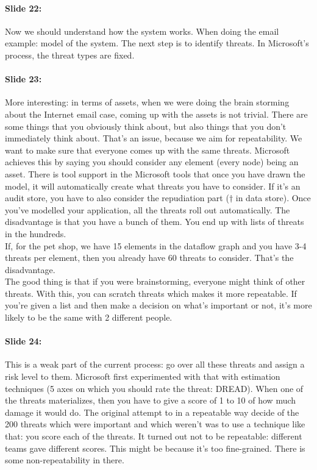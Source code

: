 \documentclass[10pt,a4paper]{report}
\begin{document}
\paragraph{Slide 22:} Now we should understand how the system works. When doing the email example: model of the system. The next step is to identify threats. In Microsoft's process, the threat types are fixed.

\paragraph{Slide 23:} More interesting: in terms of assets, when we were doing the brain storming about the Internet email case, coming up with the assets is not trivial. There are some things that you obviously think about, but also things that you don't immediately think about. That's an issue, because we aim for repeatability. We want to make sure that everyone comes up with the same threats. Microsoft achieves this by saying you should consider any element (every node) being an asset. There is tool support in the Microsoft tools that once you have drawn the model, it will automatically create what threats you have to consider. If it's an audit store, you have to also consider the repudiation part ($\dagger$ in data store). Once you've modelled your application, all the threats roll out automatically. The disadvantage is that you have a bunch of them.  You end up with lists of threats in the hundreds. \\
If, for the pet shop, we have 15 elements in the dataflow graph and you have 3-4 threats per element, then you already have 60 threats to consider. That's the disadvantage.\\
The good thing is that if you were brainstorming, everyone might think of other threats. With this, you can scratch threats which makes it more repeatable. If you're given a list and then make a decision on what's important or not, it's more likely to be the same with 2 different people.

\paragraph{Slide 24:} This is a weak part of the current process: go over all these threats and assign a risk level to them. Microsoft first experimented with that with estimation techniques (5 axes on which you should rate the threat: DREAD). When one of the threats materializes, then you have to give a score of 1 to 10 of how much damage it would do. The original attempt to in a repeatable way decide of the 200 threats which were important and which weren't was to use a technique like that: you score each of the threats. It turned out not to be repeatable: different teams gave different scores. This might be because it's too fine-grained. There is some non-repeatability in there. 
\end{document}
